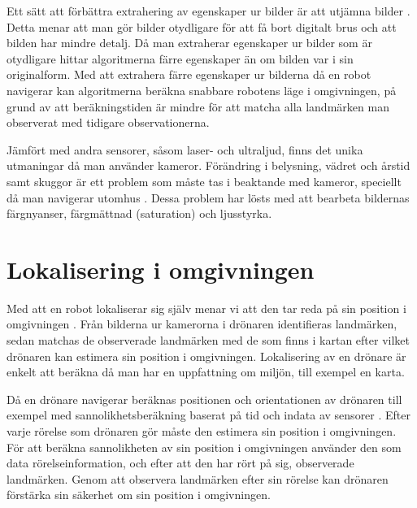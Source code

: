 Ett sätt att förbättra extrahering av egenskaper ur bilder är att utjämna bilder \citep{mapbuildingsift}. Detta menar att man gör bilder otydligare för att få bort digitalt brus och att bilden har mindre detalj. Då man extraherar egenskaper ur bilder som är otydligare hittar algoritmerna färre egenskaper än om bilden var i sin originalform. Med att extrahera färre egenskaper ur bilderna då en robot navigerar kan algoritmerna beräkna snabbare robotens läge i omgivningen, på grund av att beräkningstiden är mindre för att matcha alla landmärken man observerat med tidigare observationerna.

Jämfört med andra sensorer, såsom laser- och ultraljud, finns det unika utmaningar då man använder kameror. Förändring i belysning, vädret och årstid samt skuggor är ett problem som måste tas i beaktande med kameror, speciellt då man navigerar utomhus \citep{982903}. Dessa problem har lösts med att bearbeta bildernas färgnyanser, färgmättnad (saturation) och ljusstyrka.

\section{Lokalisering i omgivningen}

Med att en robot lokaliserar sig själv menar vi att den tar reda på sin position i omgivningen \citep{982903}. Från bilderna ur kamerorna i drönaren identifieras landmärken, sedan matchas de observerade landmärken med de som finns i kartan efter vilket drönaren kan estimera sin position i omgivningen. Lokalisering av en drönare är enkelt att beräkna då man har en uppfattning om miljön, till exempel en karta.

Då en drönare navigerar beräknas positionen och orientationen av drönaren till exempel med sannolikhetsberäkning baserat på tid och indata av sensorer \citep{ProbabilisticRobotics}. Efter varje rörelse som drönaren gör måste den estimera sin position i omgivningen. För att beräkna sannolikheten av sin position i omgivningen använder den som data rörelseinformation, och efter att den har rört på sig, observerade landmärken. Genom att observera landmärken efter sin rörelse kan drönaren förstärka sin säkerhet om sin position i omgivningen. 

